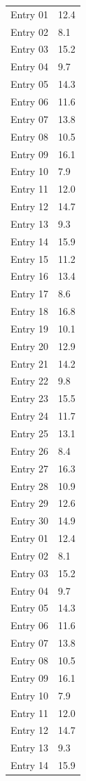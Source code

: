 \begin{longtable}{ll}
	Entry 01 & 12.4 \\
	Entry 02 & 8.1  \\
	Entry 03 & 15.2 \\
	Entry 04 & 9.7  \\
	Entry 05 & 14.3 \\
	Entry 06 & 11.6 \\
	Entry 07 & 13.8 \\
	Entry 08 & 10.5 \\
	Entry 09 & 16.1 \\
	Entry 10 & 7.9  \\
	Entry 11 & 12.0 \\
	Entry 12 & 14.7 \\
	Entry 13 & 9.3  \\
	Entry 14 & 15.9 \\
	Entry 15 & 11.2 \\
	Entry 16 & 13.4 \\
	Entry 17 & 8.6  \\
	Entry 18 & 16.8 \\
	Entry 19 & 10.1 \\
	Entry 20 & 12.9 \\
	Entry 21 & 14.2 \\
	Entry 22 & 9.8  \\
	Entry 23 & 15.5 \\
	Entry 24 & 11.7 \\
	Entry 25 & 13.1 \\
	Entry 26 & 8.4  \\
	Entry 27 & 16.3 \\
	Entry 28 & 10.9 \\
	Entry 29 & 12.6 \\
	Entry 30 & 14.9 \\
Entry 01 & 12.4 \\
Entry 02 & 8.1  \\
Entry 03 & 15.2 \\
Entry 04 & 9.7  \\
Entry 05 & 14.3 \\
Entry 06 & 11.6 \\
Entry 07 & 13.8 \\
Entry 08 & 10.5 \\
Entry 09 & 16.1 \\
Entry 10 & 7.9  \\
Entry 11 & 12.0 \\
Entry 12 & 14.7 \\
Entry 13 & 9.3  \\
Entry 14 & 15.9 \\

\end{longtable}
